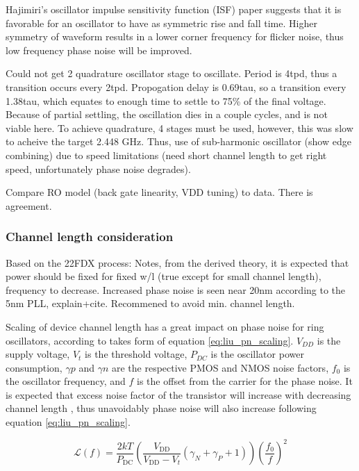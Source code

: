 	Hajimiri's oscillator impulse sensitivity function (ISF) paper \cite{Hajimiri1998} suggests that it is favorable for an oscillator to have as symmetric rise and fall time. Higher symmetry of waveform results in a lower corner frequency for flicker noise, thus low frequency phase noise will be improved.

	 Could not get 2 quadrature oscillator stage to oscillate. Period is 4tpd, thus a transition occurs every 2tpd. Propogation delay is 0.69tau, so a transition every 1.38tau, which equates to enough time to settle to 75\% of the final voltage. Because of partial settling, the oscillation dies in a couple cycles, and is not viable here. To achieve quadrature, 4 stages must be used, however, this was slow to acheive the target 2.448 GHz. Thus, use of sub-harmonic oscillator (show edge combining) due to speed limitations (need short channel length to get right speed, unfortunately phase noise degrades).

	 Compare RO model (back gate linearity, VDD tuning) to data. There is agreement.

	\subsubsection{Channel length consideration}
	Based on the 22FDX process:
	Notes, from the derived theory, it is expected that power should be fixed for fixed w/l (true except for small channel length), frequency to decrease. Increased phase noise is seen near 20nm according to the 5nm PLL, explain+cite. Recommened to avoid min. channel length. 

	Scaling of device channel length has a great impact on phase noise for ring oscillators, according to \cite{Liu2020} takes form of equation \ref{eq:liu_pn_scaling}. $V_{DD}$ is the supply voltage, $V_t$ is the threshold voltage, $P_{DC}$ is the oscillator power consumption, $\gamma p$ and $\gamma n$ are the respective PMOS and NMOS noise factors, $f_0$ is the oscillator frequency, and $f$ is the offset from the carrier for the phase noise. It is expected that excess noise factor of the transistor will increase with decreasing channel length \cite{Antonopoulos2013}, thus unavoidably phase noise will also increase following equation \ref{eq:liu_pn_scaling}.

	\begin{equation} \label{eq:liu_pn_scaling}
		\mathcal {L}(f) =\frac {2kT}{P_{\textrm {DC}}}\left ({\frac {V_{\textrm {DD}}}{V_{\textrm {DD}}-V_{t}} (\gamma _{N}+\gamma _{P}+1)}\right)\left ({\frac {f_{0}}{f}}\right)^{2}
	\end{equation}

